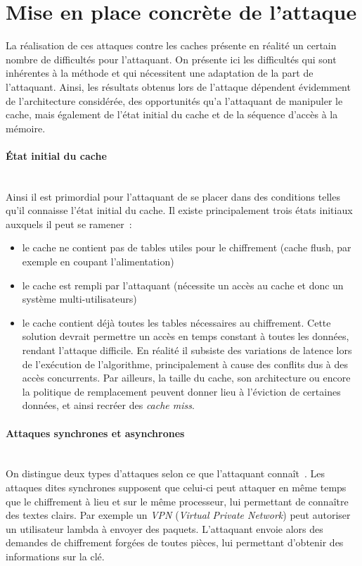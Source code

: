 \documentclass[a4paper,11pt]{article}
\begin{document}
 

\section{Mise en place concrète de l'attaque}

La réalisation de ces attaques contre les caches présente en réalité un certain nombre de difficultés pour l'attaquant. On présente ici les difficultés qui sont inhérentes à la méthode et qui nécessitent une adaptation de la part de l'attaquant. Ainsi, les résultats obtenus lors de l'attaque dépendent évidemment de l'architecture considérée, des opportunités qu'a l'attaquant de manipuler le cache, mais également de l'état initial du cache et de la séquence d'accès à la mémoire. 

\paragraph{État initial du cache} ~\\ 
Ainsi il est primordial pour l'attaquant de se placer dans des conditions telles qu'il connaisse l'état initial du cache. Il existe principalement trois états initiaux auxquels il peut se ramener~\cite{canteaut2006understanding}:
\begin{itemize}
\item le cache ne contient pas de tables utiles pour le chiffrement (cache flush, par exemple en coupant l'alimentation)
\item le cache est rempli par l'attaquant (nécessite un accès au cache et donc un système multi-utilisateurs) 
\item le cache contient déjà toutes les tables nécessaires au chiffrement. Cette solution devrait permettre un accès en temps constant à toutes les données, rendant l'attaque difficile. En réalité il subsiste des variations de latence lors de l'exécution de l'algorithme, principalement à cause des conflits dus à des accès concurrents. Par ailleurs, la taille du cache, son architecture ou encore la politique de remplacement peuvent donner lieu à l'éviction de certaines données, et ainsi recréer des \emph{cache miss}.
\end{itemize}

\paragraph{Attaques synchrones et asynchrones} ~\\
On distingue deux types d'attaques selon ce que l'attaquant connaît~\cite{osvik2006cache}. Les attaques dites synchrones supposent que celui-ci peut attaquer en même temps que le chiffrement à lieu et sur le même processeur, lui permettant de connaître des textes clairs. Par exemple un \emph{VPN} (\emph{Virtual Private Network}) peut autoriser un utilisateur lambda à envoyer des paquets. L'attaquant envoie alors des demandes de chiffrement forgées de toutes pièces, lui permettant d'obtenir des informations sur la clé. 
\end{document}
